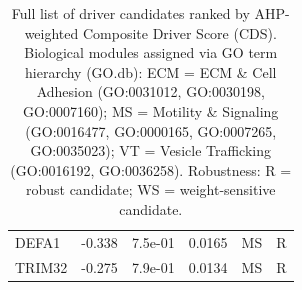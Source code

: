\begin{table}[ht]
\begin{tabular}{lrlrll}
  DEFA1 & -0.338 & 7.5e-01 & 0.0165 & MS & R \\ 
  TRIM32 & -0.275 & 7.9e-01 & 0.0134 & MS & R \\ 
   \hline
\end{tabular}
\caption{Full list of driver candidates ranked by AHP-weighted Composite Driver Score (CDS). 
    Biological modules assigned via GO term hierarchy (GO.db): ECM = ECM \& Cell Adhesion 
    (GO:0031012, GO:0030198, GO:0007160); MS = Motility \& Signaling (GO:0016477, GO:0000165, 
    GO:0007265, GO:0035023); VT = Vesicle Trafficking (GO:0016192, GO:0036258). 
    Robustness: R = robust candidate; WS = weight-sensitive candidate.} 
\label{tab:candidates}
\end{table}
